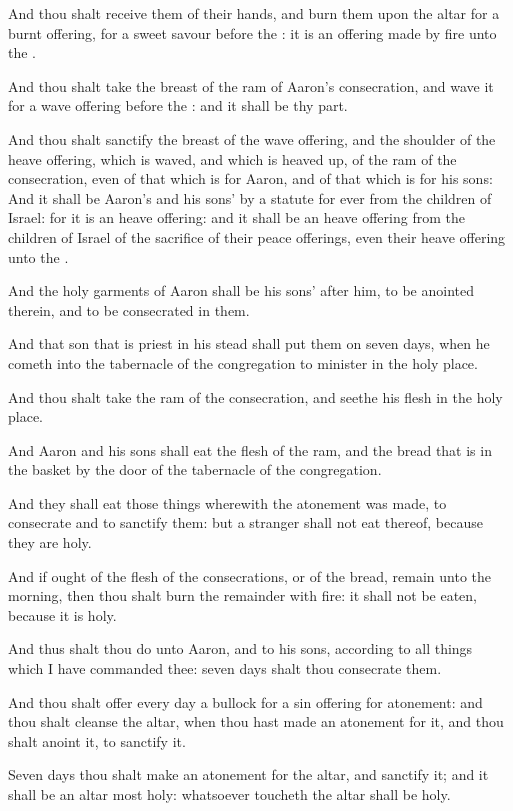 \verse And thou shalt receive them of their hands, and burn them upon the altar for a burnt offering, for a sweet savour before the \LORD: it is an offering made by fire unto the \LORD.

\verse And thou shalt take the breast of the ram of Aaron's consecration, and wave it for a wave offering before the \LORD: and it shall be thy part.

\verse And thou shalt sanctify the breast of the wave offering, and the shoulder of the heave offering, which is waved, and which is heaved up, of the ram of the consecration, even of that which is for Aaron, and of that which is for his sons: \verse And it shall be Aaron's and his sons' by a statute for ever from the children of Israel: for it is an heave offering: and it shall be an heave offering from the children of Israel of the sacrifice of their peace offerings, even their heave offering unto the \LORD.

\verse And the holy garments of Aaron shall be his sons' after him, to be anointed therein, and to be consecrated in them.

\verse And that son that is priest in his stead shall put them on seven days, when he cometh into the tabernacle of the congregation to minister in the holy place.

\verse And thou shalt take the ram of the consecration, and seethe his flesh in the holy place.

\verse And Aaron and his sons shall eat the flesh of the ram, and the bread that is in the basket by the door of the tabernacle of the congregation.

\verse And they shall eat those things wherewith the atonement was made, to consecrate and to sanctify them: but a stranger shall not eat thereof, because they are holy.

\verse And if ought of the flesh of the consecrations, or of the bread, remain unto the morning, then thou shalt burn the remainder with fire: it shall not be eaten, because it is holy.

\verse And thus shalt thou do unto Aaron, and to his sons, according to all things which I have commanded thee: seven days shalt thou consecrate them.

\verse And thou shalt offer every day a bullock for a sin offering for atonement: and thou shalt cleanse the altar, when thou hast made an atonement for it, and thou shalt anoint it, to sanctify it.

\verse Seven days thou shalt make an atonement for the altar, and sanctify it; and it shall be an altar most holy: whatsoever toucheth the altar shall be holy.

